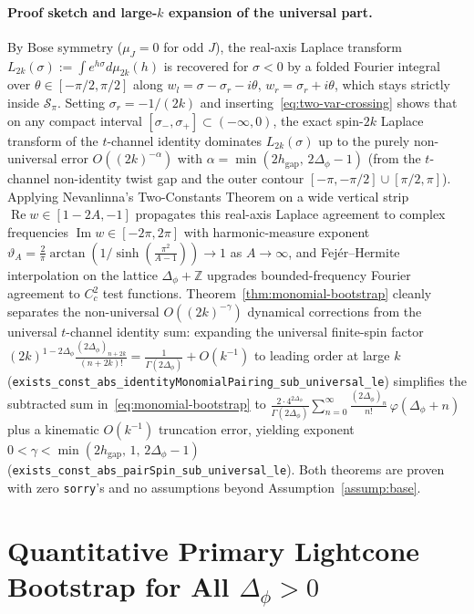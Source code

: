 \documentclass[10pt,a4paper]{article}
\theoremstyle{definition}
\begin{document}
\paragraph{Proof sketch and large-$k$ expansion of the universal part.}
By Bose symmetry ($\mu_J = 0$ for odd $J$), the real-axis Laplace transform $L_{2k}(\sigma) := \int e^{h\sigma} d\mu_{2k}(h)$ is recovered for $\sigma < 0$ by a folded Fourier integral over $\theta \in [-\pi/2, \pi/2]$ along $w_l = \sigma - \sigma_r - i\theta$, $w_r = \sigma_r + i\theta$, which stays strictly inside $\mathcal{S}_\pi$. Setting $\sigma_r = -1/(2k)$ and inserting~\eqref{eq:two-var-crossing} shows that on any compact interval $[\sigma_-, \sigma_+] \subset (-\infty, 0)$, the exact spin-$2k$ Laplace transform of the $t$-channel identity dominates $L_{2k}(\sigma)$ up to the purely non-universal error $O((2k)^{-\alpha})$ with $\alpha = \min(2 h_{\mathrm{gap}},\, 2\Delta_\phi - 1)$ (from the $t$-channel non-identity twist gap and the outer contour $[-\pi, -\pi/2] \cup [\pi/2, \pi]$). Applying Nevanlinna's Two-Constants Theorem on a wide vertical strip $\operatorname{Re} w \in [1 - 2A, -1]$ propagates this real-axis Laplace agreement to complex frequencies $\operatorname{Im} w \in [-2\pi, 2\pi]$ with harmonic-measure exponent $\vartheta_A = \frac{2}{\pi}\arctan(1/\sinh(\frac{\pi^2}{A-1})) \to 1$ as $A \to \infty$, and Fej\'er--Hermite interpolation on the lattice $\Delta_\phi + \mathbb{Z}$ upgrades bounded-frequency Fourier agreement to $C_c^2$ test functions. Theorem~\ref{thm:monomial-bootstrap} cleanly separates the non-universal $O((2k)^{-\gamma})$ dynamical corrections from the universal $t$-channel identity sum: expanding the universal finite-spin factor $(2k)^{1 - 2\Delta_\phi}\frac{(2\Delta_\phi)_{n + 2k}}{(n + 2k)!} = \frac{1}{\Gamma(2\Delta_\phi)} + O(k^{-1})$ to leading order at large $k$ (\texttt{exists\_const\_abs\_identityMonomialPairing\_sub\_universal\_le}) simplifies the subtracted sum in~\eqref{eq:monomial-bootstrap} to $\frac{2 \cdot 4^{2\Delta_\phi}}{\Gamma(2\Delta_\phi)} \sum_{n=0}^{\infty} \frac{(2\Delta_\phi)_n}{n!} \, \varphi(\Delta_\phi + n)$ plus a kinematic $O(k^{-1})$ truncation error, yielding exponent $0 < \gamma < \min(2 h_{\mathrm{gap}},\, 1,\, 2\Delta_\phi - 1)$ (\texttt{exists\_const\_abs\_pairSpin\_sub\_universal\_le}). Both theorems are proven with zero \texttt{sorry}'s and no assumptions beyond Assumption~\ref{assump:base}.

\section{Quantitative Primary Lightcone Bootstrap for All \texorpdfstring{$\Delta_\phi > 0$}{Delta\_phi > 0}}
\end{document}
